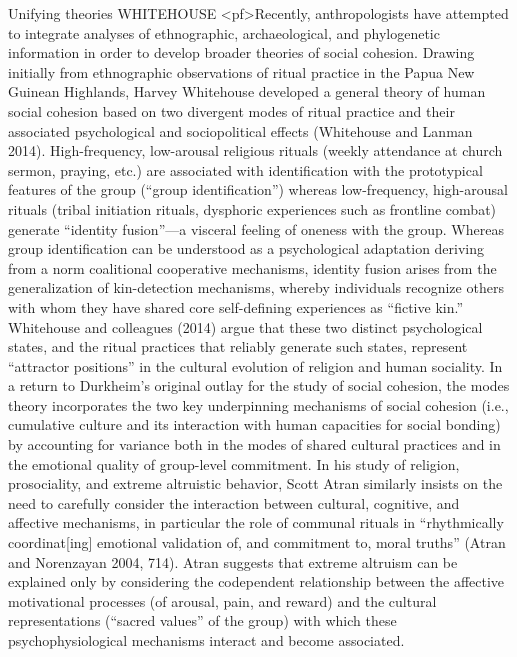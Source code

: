 Unifying theories WHITEHOUSE
<pf>Recently, anthropologists have attempted to integrate analyses of ethnographic, archaeological, and phylogenetic information in order to develop broader theories of social cohesion. Drawing initially from ethnographic observations of ritual practice in the Papua New Guinean Highlands, Harvey Whitehouse developed a general theory of human social cohesion based on two divergent modes of ritual practice and their associated psychological and sociopolitical effects (Whitehouse and Lanman 2014). High-frequency, low-arousal religious rituals (weekly attendance at church sermon, praying, etc.) are associated with identification with the prototypical features of the group (“group identification”) whereas low-frequency, high-arousal rituals (tribal initiation rituals, dysphoric experiences such as frontline combat) generate “identity fusion”—a visceral feeling of oneness with the group.
Whereas group identification can be understood as a psychological adaptation deriving from a norm coalitional cooperative mechanisms, identity fusion arises from the generalization of kin-detection mechanisms, whereby individuals recognize others with whom they have shared core self-defining experiences as “fictive kin.” Whitehouse and colleagues (2014) argue that these two distinct psychological states, and the ritual practices that reliably generate such states, represent “attractor positions” in the cultural evolution of religion and human sociality. In a return to Durkheim’s original outlay for the study of social cohesion, the modes theory incorporates the two key underpinning mechanisms of social cohesion (i.e., cumulative culture and its interaction with human capacities for social bonding) by accounting for variance both in the modes of shared cultural practices and in the emotional quality of group-level commitment.
In his study of religion, prosociality, and extreme altruistic behavior, Scott Atran similarly insists on the need to carefully consider the interaction between cultural, cognitive, and affective mechanisms, in particular the role of communal rituals in “rhythmically coordinat[ing] emotional validation of, and commitment to, moral truths” (Atran and Norenzayan 2004, 714). Atran suggests that extreme altruism can be explained only by considering the codependent relationship between the affective motivational processes (of arousal, pain, and reward) and the cultural representations (“sacred values” of the group) with which these psychophysiological mechanisms interact and become associated.
